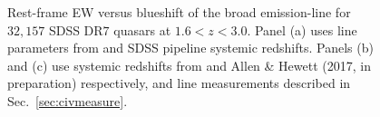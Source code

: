 \begin{figure}
    \captionsetup[subfigure]{labelformat=empty}  
    \centering 
    \subfloat[\label{fig:civ_space_z_compare_a}]{}
    \subfloat[\label{fig:civ_space_z_compare_b}]{}
    \subfloat[\label{fig:civ_space_z_compare_c}]{}
    \caption[{Rest-frame EW versus blueshift of the broad  emission-line for $32,157$ SDSS DR$7$ quasars at $1.6 < z < 3.0$.}]{Rest-frame EW versus blueshift of the broad  emission-line for $32,157$ SDSS DR$7$ quasars at $1.6 < z < 3.0$. Panel (a) uses  line parameters from \citet{shen11} and SDSS pipeline systemic redshifts. Panels (b) and (c) use systemic redshifts from \citet{hewett10} and Allen \& Hewett (2017, in preparation) respectively, and  line measurements described in Sec.~\ref{sec:civmeasure}.} 
    \label{fig:civ_space_z_compare}
\end{figure}


